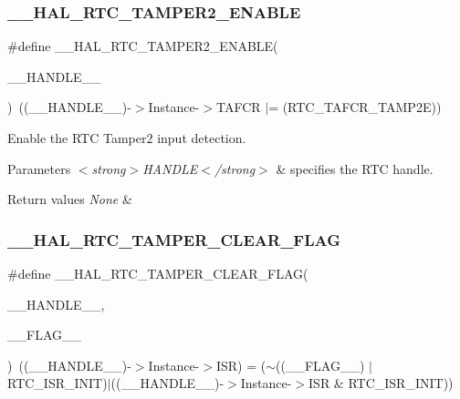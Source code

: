 \subsubsection{\texorpdfstring{\+\_\+\+\_\+\+H\+A\+L\+\_\+\+R\+T\+C\+\_\+\+T\+A\+M\+P\+E\+R2\+\_\+\+E\+N\+A\+B\+LE}{\_\_HAL\_RTC\_TAMPER2\_ENABLE}}
{\footnotesize\ttfamily \#define \+\_\+\+\_\+\+H\+A\+L\+\_\+\+R\+T\+C\+\_\+\+T\+A\+M\+P\+E\+R2\+\_\+\+E\+N\+A\+B\+LE(\begin{DoxyParamCaption}\item[{}]{\+\_\+\+\_\+\+H\+A\+N\+D\+L\+E\+\_\+\+\_\+ }\end{DoxyParamCaption})~((\+\_\+\+\_\+\+H\+A\+N\+D\+L\+E\+\_\+\+\_\+)-\/$>$Instance-\/$>$T\+A\+F\+CR $\vert$= (R\+T\+C\+\_\+\+T\+A\+F\+C\+R\+\_\+\+T\+A\+M\+P2E))}



Enable the R\+TC Tamper2 input detection. 


\begin{DoxyParams}{Parameters}
{\em $<$strong$>$\+H\+A\+N\+D\+L\+E$<$/strong$>$} & specifies the R\+TC handle. \\
\hline
\end{DoxyParams}

\begin{DoxyRetVals}{Return values}
{\em None} & \\
\hline
\end{DoxyRetVals}
\mbox{\label{group___r_t_c_ex___tamper_gade364b4cf1214d66463c9fa4ce667095}} 
\subsubsection{\texorpdfstring{\+\_\+\+\_\+\+H\+A\+L\+\_\+\+R\+T\+C\+\_\+\+T\+A\+M\+P\+E\+R\+\_\+\+C\+L\+E\+A\+R\+\_\+\+F\+L\+AG}{\_\_HAL\_RTC\_TAMPER\_CLEAR\_FLAG}}
{\footnotesize\ttfamily \#define \+\_\+\+\_\+\+H\+A\+L\+\_\+\+R\+T\+C\+\_\+\+T\+A\+M\+P\+E\+R\+\_\+\+C\+L\+E\+A\+R\+\_\+\+F\+L\+AG(\begin{DoxyParamCaption}\item[{}]{\+\_\+\+\_\+\+H\+A\+N\+D\+L\+E\+\_\+\+\_\+,  }\item[{}]{\+\_\+\+\_\+\+F\+L\+A\+G\+\_\+\+\_\+ }\end{DoxyParamCaption})~((\+\_\+\+\_\+\+H\+A\+N\+D\+L\+E\+\_\+\+\_\+)-\/$>$Instance-\/$>$I\+SR) = ($\sim$((\+\_\+\+\_\+\+F\+L\+A\+G\+\_\+\+\_\+) $\vert$ R\+T\+C\+\_\+\+I\+S\+R\+\_\+\+I\+N\+IT)$\vert$((\+\_\+\+\_\+\+H\+A\+N\+D\+L\+E\+\_\+\+\_\+)-\/$>$Instance-\/$>$I\+SR \& R\+T\+C\+\_\+\+I\+S\+R\+\_\+\+I\+N\+IT))}



